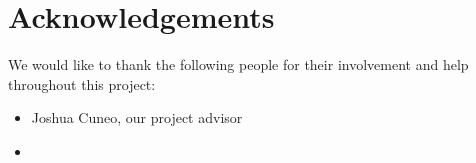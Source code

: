 \documentclass[12pt]{article}
\begin{document}
\newpage %
\section*{Acknowledgements} %
We would like to thank the following people for their involvement and help throughout this project:


\begin{itemize} %
    \item Joshua Cuneo, our project advisor
    \item 
\end{itemize}

\newpage %
\tableofcontents %
\newpage
\listoflistings
\newpage 
\listoffigures %
\end{document}
